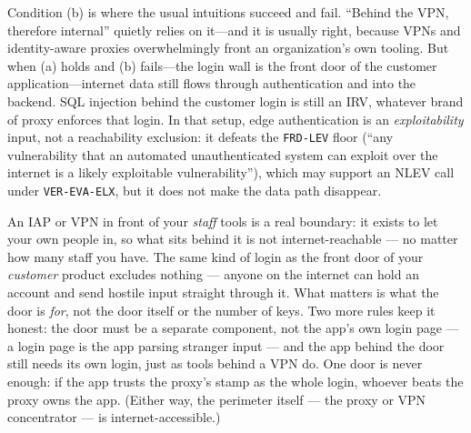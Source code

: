 \documentclass[11pt]{article}
\newcommand{\code}[1]{\texttt{#1}}
\begin{document}
Condition (b) is where the usual intuitions succeed and fail. ``Behind the VPN, therefore internal'' quietly relies on it---and it is usually right, because VPNs and identity-aware proxies overwhelmingly front an organization's own tooling. But when (a) holds and (b) fails---the login wall is the front door of the customer application---internet data still flows through authentication and into the backend. SQL injection behind the customer login is still an IRV, whatever brand of proxy enforces that login. In that setup, edge authentication is an \emph{exploitability} input, not a reachability exclusion: it defeats the \code{FRD-LEV} floor (``any vulnerability that an automated unauthenticated system can exploit over the internet is a likely exploitable vulnerability''), which may support an NLEV call under \code{VER-EVA-ELX}, but it does not make the data path disappear.

\begin{plain}
An IAP or VPN in front of your \emph{staff} tools is a real boundary: it exists to let your own people in, so what sits behind it is not internet-reachable --- no matter how many staff you have. The same kind of login as the front door of your \emph{customer} product excludes nothing --- anyone on the internet can hold an account and send hostile input straight through it. What matters is what the door is \emph{for}, not the door itself or the number of keys. Two more rules keep it honest: the door must be a separate component, not the app's own login page --- a login page is the app parsing stranger input --- and the app behind the door still needs its own login, just as tools behind a VPN do. One door is never enough: if the app trusts the proxy's stamp as the whole login, whoever beats the proxy owns the app. (Either way, the perimeter itself --- the proxy or VPN concentrator --- is internet-accessible.)
\end{plain}
\end{document}
